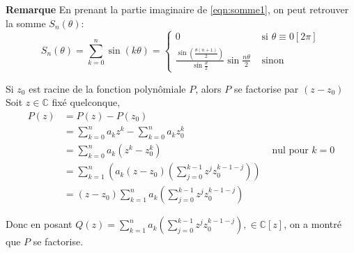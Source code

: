 \documentclass{article}
\renewenvironment{question_kholle}[2][ ]
{
	\subsection{\texorpdfstring{#2}{}}
	\notblank{#1}
	{
		\noindent #1
		\bigbreak
	}
	{}
	\begin{proof}
}
{
	\end{proof}
}
\begin{document}
\textbf{Remarque}
En prenant la partie imaginaire de \eqref{eqn:somme1}, on peut retrouver la somme $S_n(\theta)$:
$$
  S_{n}(\theta)= \sum_{k=0}^n \sin(k \theta) = \left\{ \begin{array}{ll}
    0                                                                                             & \text{ si } \theta \equiv 0 [2 \pi] \\
    \frac{\sin\left( \frac{\theta(n+1)}{2} \right)}{\sin \frac{\theta}{2}} \sin \frac{n\theta}{2} & \text{ sinon}
  \end{array}\right.
$$
\begin{question_kholle}
  [{Soient $n \in \mathbb{N}, (a_{0}, \dots, a_{n})\in\mathbb{C}^{n+1}$ et $z_{0} \in \mathbb{C}$ Posons pour tout $z \in \mathbb{C}, P(z) = \sum_{k=0}^{n}a_{k}z^{k}$
  \begin{propositions}
    \item Si $P(z_{0}) = 0$, alors $\exists Q \in\mathbb{C}[z]:\forall z \in \mathbb{C}, P(z)=(z-z_{0})Q(z)$
  \end{propositions}
  }]
  {Si $z_0$ est racine de la fonction polynômiale $P$, alors $P$ se factorise par $(z-z_0)$}
  Soit $z \in \mathbb{C}$ fixé quelconque,
  \begin{align*}
    P(z) & = P(z) - P(z_{0})                                                                                                        \\
         & = \sum_{k=0}^{n}a_{k}z^{k} - \sum_{k=0}^{n}a_{k}z_{0}^{k}                                                                \\
         & = \sum_{k=0}^{n}a_{k}(z^{k}-z_{0}^{k})                                                          & \text{ nul pour }k = 0 \\
         & = \sum_{k=1}^{n}\left( a_{k}(z-z_{0})\left( \sum _{j=0}^{k-1}z^{j}z_{0}^{k-1-j} \right) \right)                          \\
         & = (z-z_{0}) \sum_{k=1}^{n}a_{k}\left( \sum _{j=0}^{k-1}z^{j}z_{0}^{k-1-j} \right)
  \end{align*}

  Donc en posant $Q(z) = \sum_{k=1}^{n}a_{k}\left( \sum _{j=0}^{k-1}z^{j}z_{0}^{k-1-j} \right), \in \mathbb{C}[z]$, on a montré que $P$ se factorise.
\end{question_kholle}
\end{document}
